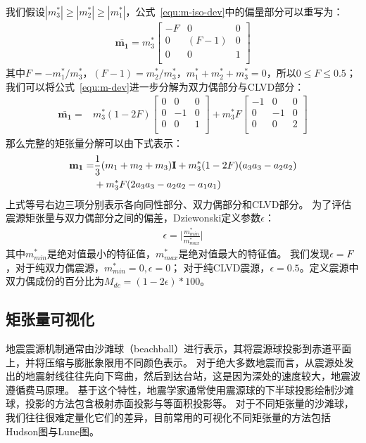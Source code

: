 我们假设$|m_3^*| \geq |m_2^*| \geq |m_1^*|$，公式~\ref{equ:m-iso-dev}中的偏量部分可以重写为：
\begin{align}
    \mathbf{\bar{m_1}}
    = m_3^*
    \begin{bmatrix}
        -F & 0 & 0 \\
        0 & (F-1) & 0 \\
        0 & 0 & 1 \\
    \end{bmatrix}
    \label{equ:m-dev}
\end{align}
其中$F = - m_1^* / m_3^*$，$(F-1) = m_2^* / m_3^*$，$m_1^* + m_2^* + m_3^* = 0$，所以$0 \leq F \leq 0.5$；
我们可以将公式~\ref{equ:m-dev}进一步分解为双力偶部分与CLVD部分：
\begin{align}
    \bar{\mathbf{m_1}}
    = & m_3^* (1-2F)
    \begin{bmatrix}
        0 & 0 & 0 \\
        0 & -1 & 0 \\
        0 & 0 & 1 \\
    \end{bmatrix}
    + m_3^* F
    \begin{bmatrix}
        -1 & 0 & 0 \\
        0 & -1 & 0 \\
        0 & 0 & 2 \\
    \end{bmatrix} 
    \label{equ:dc-clvd}
\end{align}
那么完整的矩张量分解可以由下式表示：
\begin{align}
    \mathbf{m_1} = &\frac{1}{3} (m_1+m_2+m_3) \mathbf{I}
    + m_3^*(1-2F)(a_3 a_3 - a_2 a_2) \notag \\
    & + m_3^*F (2a_3 a_3 - a_2 a_2 - a_1 a_1)
    \label{equ:M-iso-dc-clvd}
\end{align}
上式等号右边三项分别表示各向同性部分、双力偶部分和CLVD部分。
为了评估震源矩张量与双力偶部分之间的偏差，Dziewonski\citep{Dziewonski1981}定义参数$\epsilon$：
\begin{align}
    \epsilon = \bigl| \frac{m_{min}^*}{m_{max}^*} \bigl| 
\end{align}
其中$m_{min}^*$是绝对值最小的特征值，$m_{max}^*$是绝对值最大的特征值。
我们发现$\epsilon =F$，对于纯双力偶震源，$m_{min}^*=0, \epsilon=0$；
对于纯CLVD震源，$\epsilon=0.5$。定义震源中双力偶成份的百分比为$M_{dc}=(1-2\epsilon)\ast 100$。


\subsection{矩张量可视化}
地震震源机制通常由沙滩球（beachball）进行表示，其将震源球投影到赤道平面上，并将压缩与膨胀象限用不同颜色表示。
对于绝大多数地震而言，从震源处发出的地震射线往往先向下弯曲，然后到达台站，这是因为深处的速度较大，地震波遵循费马原理。
基于这个特性，地震学家通常使用震源球的下半球投影绘制沙滩球，投影的方法包含极射赤面投影与等面积投影等。
对于不同矩张量的沙滩球，我们往往很难定量化它们的差异，目前常用的可视化不同矩张量的方法包括Hudson图与Lune图。

